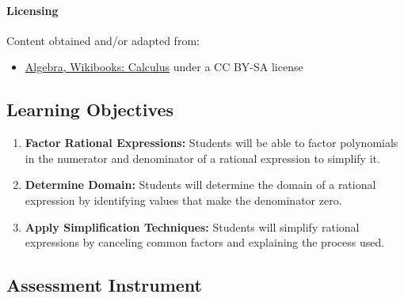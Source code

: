 \paragraph{Licensing}

Content obtained and/or adapted from:

\begin{itemize}
    \item \href{https://en.wikibooks.org/wiki/Calculus/Algebra}{Algebra, Wikibooks: Calculus} under a CC BY-SA license
\end{itemize}

\subsection{Learning Objectives}

\begin{enumerate}
    \item \textbf{Factor Rational Expressions:} Students will be able to factor polynomials in the numerator and denominator of a rational expression to simplify it.
    \item \textbf{Determine Domain:} Students will determine the domain of a rational expression by identifying values that make the denominator zero.
    \item \textbf{Apply Simplification Techniques:} Students will simplify rational expressions by canceling common factors and explaining the process used.
\end{enumerate}

\subsection{Assessment Instrument}


